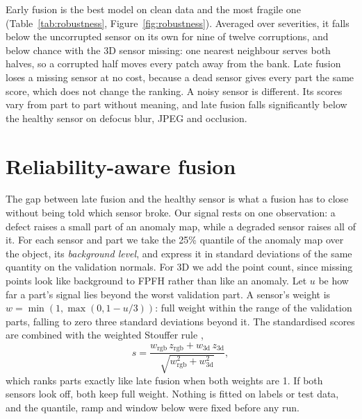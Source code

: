 \documentclass[10pt,twocolumn,letterpaper]{article}
\begin{document}
Early fusion is the best model on clean data and the most fragile one (Table~\ref{tab:robustness}, Figure~\ref{fig:robustness}). Averaged over severities, it falls below the uncorrupted sensor on its own for nine of twelve corruptions, and below chance with the 3D sensor missing: one nearest neighbour serves both halves, so a corrupted half moves every patch away from the bank. Late fusion loses a missing sensor at no cost, because a dead sensor gives every part the same score, which does not change the ranking. A noisy sensor is different. Its scores vary from part to part without meaning, and late fusion falls significantly below the healthy sensor on defocus blur, JPEG and occlusion.

\section{Reliability-aware fusion}
\label{sec:fusion}

\begin{table}[t]
\centering\small

\caption{Mean of ten categories. Corrupted columns average all RGB or all 3D corruptions over five severities. \emph{Healthy sensor alone}: the clean score of the sensor that was not corrupted, i.e.\ what a system told which sensor broke could reach by switching it off.}
\label{tab:robustness}
\end{table}

The gap between late fusion and the healthy sensor is what a fusion has to close without being told which sensor broke. Our signal rests on one observation: a defect raises a small part of an anomaly map, while a degraded sensor raises all of it. For each sensor and part we take the 25\% quantile of the anomaly map over the object, its \emph{background level}, and express it in standard deviations of the same quantity on the validation normals. For 3D we add the point count, since missing points look like background to FPFH rather than like an anomaly. Let $u$ be how far a part's signal lies beyond the worst validation part. A sensor's weight is $w = \min(1, \max(0, 1 - u/3))$: full weight within the range of the validation parts, falling to zero three standard deviations beyond it. The standardised scores are combined with the weighted Stouffer rule \citep{whitlock2005weightedz},
\begin{equation}
s = \frac{w_\text{rgb}\, z_\text{rgb} + w_\text{3d}\, z_\text{3d}}{\sqrt{w_\text{rgb}^2 + w_\text{3d}^2}},
\end{equation}
which ranks parts exactly like late fusion when both weights are 1. If both sensors look off, both keep full weight. Nothing is fitted on labels or test data, and the quantile, ramp and window below were fixed before any run.
\end{document}
